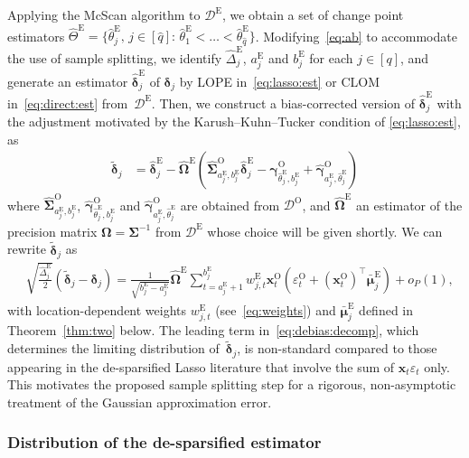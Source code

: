 \documentclass[11pt, a4paper]{article}
\newcommand{\mbf}{\mathbf}
\newcommand{\mc}{\mathcal}
\newcommand{\vep}{\varepsilon}
\renewcommand{\l}{\left}
\renewcommand{\r}{\right}
\def\wh{\widehat}
\def\wc{\widetilde}
\newcommand{\cp}{\theta}
\newcommand{\Cp}{\Theta}
\newcommand{\tE}{\text{E}}
\newcommand{\tO}{\text{O}}
\theoremstyle{definition}
\theoremstyle{definition}
\theoremstyle{definition}
\theoremstyle{definition}
\theoremstyle{definition}
\theoremstyle{remark}
\theoremstyle{definition}
\theoremstyle{definition}
\theoremstyle{definition}
\begin{document}
Applying the McScan algorithm to $\mc D^{\tE} $, we obtain a set of change point estimators $\wh{\Cp}^{\tE} = \bigl\{\wh\cp^{\tE}_j, \, j \in [\wh q]: \, \wh\cp^{\tE}_1 < \ldots < \wh\cp^{\tE}_{\wh q} \bigr\}$.
Modifying~\eqref{eq:ab} to accommodate the use of sample splitting, we identify $\wh{\Delta}^{\tE}_j$, $a^{\tE}_j$ and $b^{\tE}_j$ for each $j \in [q]$,
and generate an estimator $\wh{\bm\delta}^{\tE}_j$ of $\bm\delta_j$ by LOPE in~\eqref{eq:lasso:est} or CLOM in~\eqref{eq:direct:est} from~$\mc D^{\tE}$.
Then, we construct a bias-corrected version of $\wh{\bm\delta}^{\tE}_j$ with the adjustment motivated by the Karush--Kuhn--Tucker condition of \eqref{eq:lasso:est}, as 
\begin{align}
\label{eq:debiased}
\wc{\bm\delta}_j &= \wh{\bm\delta}^{\tE}_j - \wh{\bm\Omega}^{\tE} \l( \wh{\bm\Sigma}^{\tO}_{a^{\tE}_j, b^{\tE}_j} \wh{\bm\delta}^{\tE}_j - \wh{\bm\gamma}^{\tO}_{\wh\cp^{\tE}_j, b^{\tE}_j} + \wh{\bm\gamma}^{\tO}_{a^{\tE}_j, \wh\cp^{\tE}_j} \r)
\end{align}
where $\wh{\bm\Sigma}^{\tO}_{a^{\tE}_j, b^{\tE}_j}$, $\wh{\bm\gamma}^{\tO}_{\wh\cp^{\tE}_j, b^{\tE}_j}$ and $\wh{\bm\gamma}^{\tO}_{a^{\tE}_j, \wh\cp^{\tE}_j}$ are obtained from $\mc D^{\tO}$, and $\wh{\bm\Omega}^{\tE}$  an estimator of the precision matrix $\bm\Omega = \bm\Sigma^{-1}$ from $\mc D^{\tE}$ whose choice will be given shortly.
We can rewrite $\wc{\bm\delta}_j$ as 
\begin{align}
\label{eq:debias:decomp}
& \sqrt{\frac{\wh\Delta^{\tE}_j}{2}} ( \wc{\bm\delta}_j - \bm\delta_j ) 
= \frac{1}{\sqrt{b^{\tE}_j - a^{\tE}_j}} \wh{\bm\Omega}^{\tE} 
\sum_{t = a^{\tE}_j + 1}^{b^{\tE}_j} w^{\tE}_{j, t} \mbf x^{\tO}_t \l( \vep^{\tO}_t+ (\mbf x^{\tO}_t)^\top \bar{\bm\mu}^{\tE}_j \r) + o_P(1),
\end{align}
with location-dependent weights $w^{\tE}_{j, t}$ (see~\eqref{eq:weights}) and $\bar{\bm\mu}^{\tE}_j$ defined in Theorem~\ref{thm:two} below.
The leading term in~\eqref{eq:debias:decomp}, which determines the limiting distribution of~$\wc{\bm\delta}_j$, is non-standard compared to those appearing in the de-sparsified Lasso literature that involve the sum of $\mbf x_t \vep_t$ only.
This motivates the proposed sample splitting step for a rigorous, non-asymptotic treatment of the Gaussian approximation error.

\subsubsection{Distribution of the de-sparsified estimator}
\end{document}
